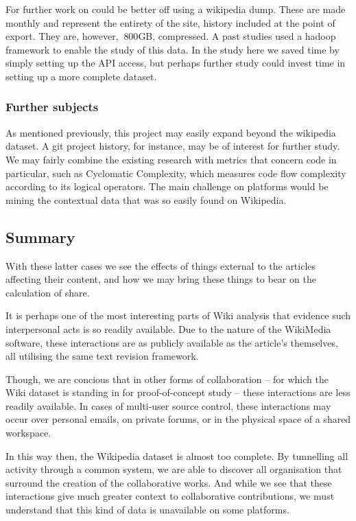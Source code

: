 For further work on could be better off using a wikipedia dump. These
are made monthly and represent the entirety of the site, history
included at the point of export. They are, however, $~800$GB,
compressed.\cite{wiki-dump} A past studies used a hadoop framework
to enable the study of this data. In the study here we saved time by
simply setting up the API access, but perhaps further study could
invest time in setting up a more complete dataset.

\subsubsection*{Further subjects}
As mentioned previously, this project may easily expand beyond the
wikipedia dataset. A git project history, for instance, may be of
interest for further study. We may fairly combine the existing
research with metrics that concern code in particular, such as
Cyclomatic Complexity, which measures code flow complexity according
to its logical operators.\cite{McCabe1976} The main challenge on
platforms would be mining the contextual data that was so easily found
on Wikipedia.

\subsection*{Summary}
With these latter cases we see the effects of things external to the
articles affecting their content, and how we may bring these things to
bear on the calculation of share. 

It is perhaps one of the most interesting parts of Wiki analysis that
evidence such interpersonal acts is so readily available. Due to the
nature of the WikiMedia software, these interactions are as publicly
available as the article's themselves, all utilising the same text
revision framework. 

Though, we are concious that in other forms of collaboration -- for
which the Wiki dataset is standing in for proof-of-concept study --
these interactions are less readily available. In cases of multi-user
source control, these interactions may occur over personal emails, on
private forums, or in the physical space of a shared workspace.

In this way then, the Wikipedia dataset is almost too complete. By
tunnelling all activity through a common system, we are able to
discover all organisation that surround the creation of the
collaborative works. And while we see that these interactions give
much greater context to collaborative contributions, we must
understand that this kind of data is unavailable on some platforms.

